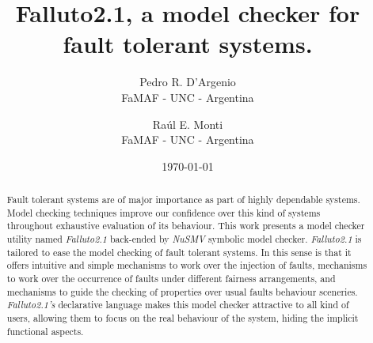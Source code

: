 \documentclass[12pt]{article}
\title{Falluto2.1, a model checker for fault tolerant systems.}
\author{ Pedro R. D'Argenio\\ FaMAF - UNC - Argentina \and Ra\'ul E. Monti\\
	 FaMAF - UNC - Argentina
}
\date{\today}
\begin{document}
\maketitle



\begin{abstract}
Fault tolerant systems are of major importance as part of highly dependable 
systems. Model checking techniques improve our confidence over this kind of
systems throughout exhaustive evaluation of its behaviour. This work presents
a model checker utility named \mbox{\textit{Falluto2.1}} back-ended by 
\mbox{\textit{NuSMV}} symbolic model checker. \mbox{\textit{Falluto2.1}} is
tailored to ease the model checking of fault tolerant systems. In this sense
is that it offers intuitive and simple mechanisms to work over the injection
of faults, mechanisms to work over the occurrence of faults under different
fairness arrangements, and mechanisms to guide the checking of properties over
usual faults behaviour sceneries. \mbox{\textit{Falluto2.1's}} declarative
language makes this model checker attractive to all kind of users, allowing
them to focus on the real behaviour of the system, hiding the implicit 
functional aspects.
\end{abstract}
\end{document}
